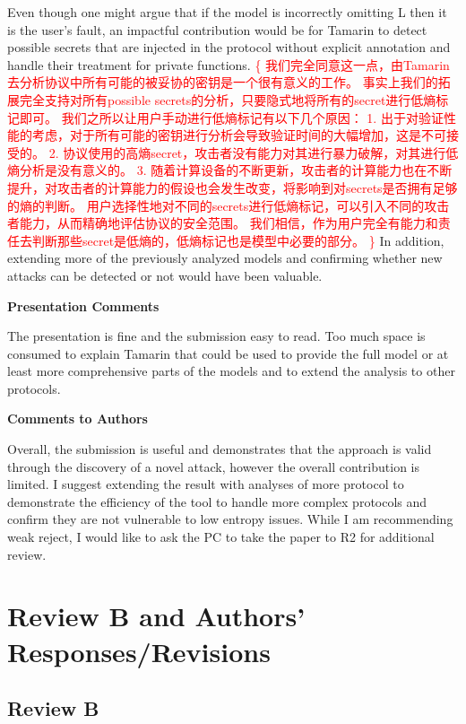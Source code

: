 \documentclass{article}
\newcommand{\response}[1]{\textcolor{red}{\{#1\}}}
\begin{document}
Even though one might argue that if the model is incorrectly omitting L then it is the user's fault, 
an impactful contribution would be for Tamarin to detect possible secrets that are injected in the protocol without explicit annotation and handle their treatment for private functions. 
\response{
    我们完全同意这一点，由Tamarin去分析协议中所有可能的被妥协的密钥是一个很有意义的工作。
    事实上我们的拓展完全支持对所有possible secrets的分析，只要隐式地将所有的secret进行低熵标记即可。
    我们之所以让用户手动进行低熵标记有以下几个原因：
    1. 出于对验证性能的考虑，对于所有可能的密钥进行分析会导致验证时间的大幅增加，这是不可接受的。
    2. 协议使用的高熵secret，攻击者没有能力对其进行暴力破解，对其进行低熵分析是没有意义的。
    3. 随着计算设备的不断更新，攻击者的计算能力也在不断提升，对攻击者的计算能力的假设也会发生改变，将影响到对secrets是否拥有足够的熵的判断。
        用户选择性地对不同的secrets进行低熵标记，可以引入不同的攻击者能力，从而精确地评估协议的安全范围。
    我们相信，作为用户完全有能力和责任去判断那些secret是低熵的，低熵标记也是模型中必要的部分。
}
In addition, extending more of the previously analyzed models and confirming whether new attacks can be detected or not would have been valuable.


\rule{0pt}{8pt}

\noindent\textbf{Presentation Comments}

The presentation is fine and the submission easy to read. 
Too much space is consumed to explain Tamarin that could be used to provide the full model or at least more comprehensive parts of the models and to extend the analysis to other protocols.

\rule{0pt}{8pt}

\noindent\textbf{Comments to Authors}

Overall, the submission is useful and demonstrates that the approach is valid through the discovery of a novel attack, however the overall contribution is limited. 
I suggest extending the result with analyses of more protocol to demonstrate the efficiency of the tool to handle more complex protocols and confirm they are not vulnerable to low entropy issues. 
While I am recommending weak reject, I would like to ask the PC to take the paper to R2 for additional review.

\section{Review B and Authors' Responses/Revisions}
\subsection{Review B}
\end{document}
